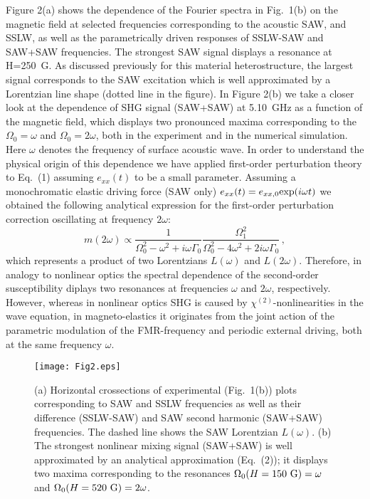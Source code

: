 \documentclass[aps,showpacs,prb,twocolumn,superscriptaddress]{revtex4}
\begin{document}
Figure 2(a) shows the dependence of the Fourier spectra in Fig.~1(b) on the magnetic field at selected frequencies corresponding to the acoustic SAW, and SSLW, as well as the parametrically driven responses of SSLW-SAW and SAW+SAW frequencies. The strongest SAW signal displays a resonance at H=250~G. As discussed previously for this material heterostructure, the largest signal corresponds to the SAW excitation  which is well approximated by a Lorentzian line shape (dotted line in the figure).  In Figure 2(b) we take a closer look at the dependence of SHG signal (SAW+SAW) at 5.10~GHz as a function of the magnetic field, which displays two pronounced maxima corresponding to the $\Omega_0=\omega$ and $\Omega_0=2\omega$, both in the experiment and in the numerical simulation. Here $\omega$ denotes the frequency of surface acoustic wave.
In order to understand the physical origin of this dependence we have applied first-order perturbation theory to Eq.~(1) assuming $e_{xx}(t)$ to be a small parameter. Assuming a monochromatic elastic driving force (SAW only) $e_{xx}(t)=e_{xx,0}{\rm exp}(i\omega t)$ we obtained the following analytical expression for the first-order perturbation correction oscillating at frequency $2\omega$:
\begin{equation}
m(2\omega)\propto\frac{1}{\Omega_0^2-\omega^2+i\omega\Gamma_0}\frac{\Omega^2_1}{\Omega_0^2-4\omega^2+2i\omega\Gamma_0}\,,
\end{equation}
which represents a product of two Lorentzians $L(\omega)$ and $L(2\omega)$. Therefore, in analogy to nonlinear optics\cite{TemnovJOPT2016} the spectral dependence of the second-order susceptibility diplays two resonances at frequencies $\omega$ and $2\omega$, respectively. However, whereas in nonlinear optics SHG is caused by  $\chi^{(2)}$-nonlinearities in the wave equation, in magneto-elastics it originates from the joint action of the parametric modulation of the FMR-frequency and periodic external driving, both at the same frequency $\omega$.

\begin{figure}
    \centering
    \texttt{[image: Fig2.eps]}
    \caption{ (a) Horizontal crossections of experimental (Fig.~1(b)) plots corresponding to SAW and SSLW frequencies as well as their difference (SSLW-SAW) and SAW second harmonic (SAW+SAW) frequencies. The dashed line shows the SAW Lorentzian $L(\omega)$. (b) The strongest nonlinear mixing signal (SAW+SAW) is well approximated by an analytical approximation (Eq.~(2)); it displays two maxima corresponding to the resonances $\Omega_0(H=150~{\rm G})=\omega$ and $\Omega_0(H=520~{\rm G})=2\omega$.}
    \label{simulation}
\end{figure}
\end{document}
